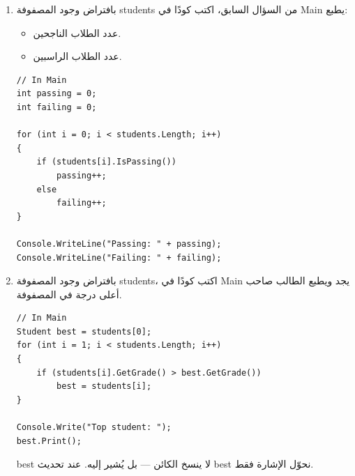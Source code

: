 \documentclass[14pt]{extarticle}
\begin{document}
\begin{enumerate}
{\begin{boxSolution}
\begin{english}
\begin{verbatim}
for (int i = 0; i < students.Length; i++)
    students[i].Print();
\end{verbatim}
\end{english}
\end{boxSolution}
}
\clearpage
\fi

\item %

بافتراض وجود المصفوفة \textenglish{students} من السؤال السابق، اكتب كودًا في \textenglish{Main} يطبع:
\begin{itemize}
    \item عدد الطلاب الناجحين.
    \item عدد الطلاب الراسبين.
\end{itemize}

\ifwithsols
{\small
\begin{boxSolution}
\begin{english}
\begin{verbatim}
// In Main
int passing = 0;
int failing = 0;

for (int i = 0; i < students.Length; i++)
{
    if (students[i].IsPassing())
        passing++;
    else
        failing++;
}

Console.WriteLine("Passing: " + passing);
Console.WriteLine("Failing: " + failing);
\end{verbatim}
\end{english}
\end{boxSolution}
}
\clearpage
\fi

\item %

بافتراض وجود المصفوفة \textenglish{students}، اكتب كودًا في \textenglish{Main} يجد ويطبع الطالب صاحب أعلى درجة في المصفوفة.

\ifwithsols
{\small
\begin{boxSolution}
\begin{english}
\begin{verbatim}
// In Main
Student best = students[0];
for (int i = 1; i < students.Length; i++)
{
    if (students[i].GetGrade() > best.GetGrade())
        best = students[i];
}

Console.Write("Top student: ");
best.Print();
\end{verbatim}
\end{english}
\end{boxSolution}
}
\begin{boxNote}
\textenglish{best} لا ينسخ الكائن — بل يُشير إليه. عند تحديث \textenglish{best} نحوّل الإشارة فقط.
\end{boxNote}
\clearpage
\fi


\end{enumerate}
\end{document}
